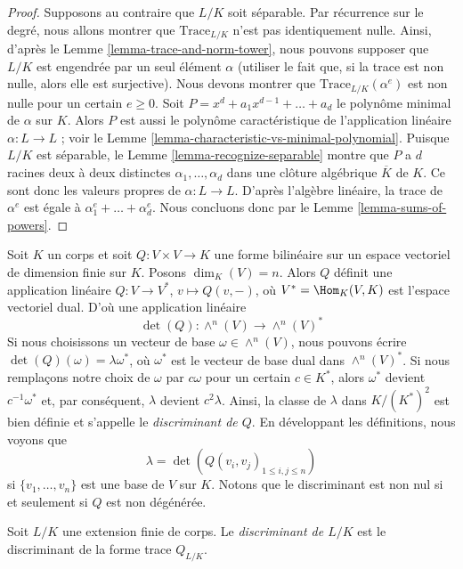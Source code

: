 \begin{proof}
\medskip\noindent
Supposons au contraire que $L/K$ soit séparable.
Par récurrence sur le degré, nous allons montrer que
$\text{Trace}_{L/K}$ n'est pas identiquement nulle.
Ainsi, d'après le Lemme \ref{lemma-trace-and-norm-tower}, nous pouvons supposer que
$L/K$ est engendrée par un seul élément $\alpha$ (utiliser le fait que, si
la trace est non nulle, alors elle est surjective).
Nous devons montrer que $\text{Trace}_{L/K}(\alpha^e)$
est non nulle pour un certain $e \geq 0$.
Soit $P = x^d + a_1 x^{d - 1} + \ldots + a_d$ le polynôme
minimal de $\alpha$ sur $K$.
Alors $P$ est aussi le polynôme caractéristique de l'application linéaire
$\alpha : L \to L$ ; voir le
Lemme \ref{lemma-characteristic-vs-minimal-polynomial}.
Puisque $L/K$ est séparable, le Lemme \ref{lemma-recognize-separable} montre
que $P$ a $d$ racines deux à deux distinctes $\alpha_1, \ldots, \alpha_d$
dans une clôture algébrique $\overline{K}$ de $K$. Ce sont donc les
valeurs propres de $\alpha : L \to L$.
D'après l'algèbre linéaire, la trace de $\alpha^e$ est
égale à $\alpha_1^e + \ldots + \alpha_d^e$.
Nous concluons donc par le Lemme \ref{lemma-sums-of-powers}.
\end{proof}

\noindent
Soit $K$ un corps et soit $Q : V \times V \to K$ une forme bilinéaire
sur un espace vectoriel de dimension finie sur $K$. Posons $\dim_K(V) = n$.
Alors $Q$ définit une application linéaire $Q : V \to V^*$, $v \mapsto Q(v, -)$,
où $V^* = \Hom_K(V, K)$ est l'espace vectoriel dual. D'où une application linéaire
$$
\det(Q) : \wedge^n(V) \longrightarrow \wedge^n(V)^*
$$
Si nous choisissons un vecteur de base $\omega \in \wedge^n(V)$, nous pouvons
écrire $\det(Q)(\omega) = \lambda \omega^*$, où $\omega^*$
est le vecteur de base dual dans $\wedge^n(V)^*$. Si nous remplaçons notre
choix de $\omega$ par $c \omega$ pour un certain $c \in K^*$, alors
$\omega^*$ devient $c^{-1} \omega^*$ et, par conséquent,
$\lambda$ devient $c^2 \lambda$. Ainsi, la classe de
$\lambda$ dans $K/(K^*)^2$ est bien définie et s'appelle le
{\it discriminant de $Q$}. En développant les définitions, nous voyons que
$$
\lambda = \det(Q(v_i, v_j)_{1 \leq i, j \leq n})
$$
si $\{v_1, \ldots, v_n\}$ est une base de $V$ sur $K$. Notons que
le discriminant est non nul si et seulement si $Q$ est non dégénérée.

\begin{definition}
\label{definition-discriminant}
Soit $L/K$ une extension finie de corps. Le
{\it discriminant de $L/K$} est le discriminant de
la forme trace $Q_{L/K}$.
\end{definition}

